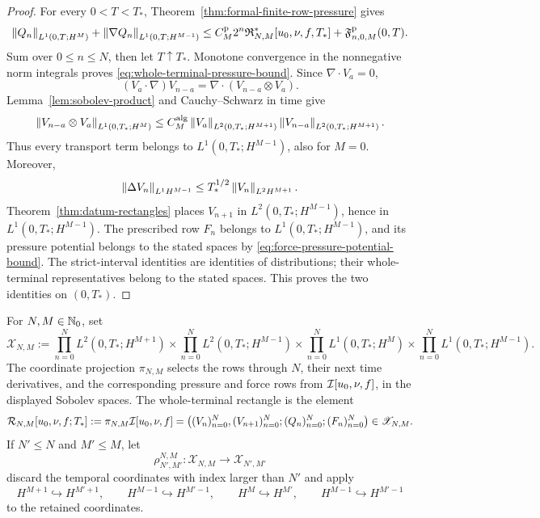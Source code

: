 \begin{proof}
For every \(0<T<T_*\),
Theorem~\ref{thm:formal-finite-row-pressure} gives
\[
 \left\lVert Q_n\right\rVert_{L^1(0,T;H^M)}
 +\left\lVert \nabla Q_n\right\rVert_{L^1(0,T;H^{M-1})}
 \le C_M^{\rm p}2^n\mathfrak R_{N,M}^*[u_0,\nu,f,T_*]
 +\mathfrak F^{\rm p}_{n,0,M}(0,T).
\]
Sum over \(0\le n\le N\), then let \(T\uparrow T_*\).  Monotone
convergence in the nonnegative norm integrals proves
\eqref{eq:whole-terminal-pressure-bound}.  Since
\(\nabla\cdot V_a=0\),
\[
 (V_a\cdot\nabla)V_{n-a}
 =\nabla\cdot(V_{n-a}\otimes V_a).
\]
Lemma~\ref{lem:sobolev-product} and Cauchy--Schwarz in time give
\[
 \left\lVert V_{n-a}\otimes V_a\right\rVert_{L^1(0,T_*;H^M)}
 \le C_M^{\rm alg}
 \left\lVert V_a\right\rVert_{L^2(0,T_*;H^{M+1})}
 \left\lVert V_{n-a}\right\rVert_{L^2(0,T_*;H^{M+1})}.
\]
Thus every transport term belongs to
\(L^1(0,T_*;H^{M-1})\), also for \(M=0\).  Moreover,
\[
 \left\lVert \Delta V_n\right\rVert_{L^1H^{M-1}}
 \le T_*^{1/2}\left\lVert V_n\right\rVert_{L^2H^{M+1}}.
\]
Theorem~\ref{thm:datum-rectangles} places \(V_{n+1}\) in
\(L^2(0,T_*;H^{M-1})\), hence in \(L^1(0,T_*;H^{M-1})\).
The prescribed row \(F_n\) belongs to \(L^1(0,T_*;H^{M-1})\), and its
pressure potential belongs to the stated spaces by
\eqref{eq:force-pressure-potential-bound}.
The strict-interval identities are identities of distributions; their
whole-terminal representatives belong to the stated spaces.  This proves the
two identities on \((0,T_*)\).
\end{proof}

\begin{definition}
\label{def:finite-window-space}
For \(N,M\in\mathbb N_0\), set
\[
 \mathscr X_{N,M}:=
 \prod_{n=0}^{N}L^2(0,T_*;H^{M+1})
 \times
 \prod_{n=0}^{N}L^2(0,T_*;H^{M-1})
 \times
 \prod_{n=0}^{N}L^1(0,T_*;H^M)
 \times
 \prod_{n=0}^{N}L^1(0,T_*;H^{M-1}).
\]
The coordinate projection \(\pi_{N,M}\) selects the rows through
\(N\), their next time derivatives, and the corresponding pressure and force
rows from \(\mathcal I[u_0,\nu,f]\), in the displayed Sobolev spaces.
The whole-terminal rectangle is the element
\begin{equation}
 \mathcal R_{N,M}[u_0,\nu,f;T_*]
 :=\pi_{N,M}\mathcal I[u_0,\nu,f]=\left(
 (V_n)_{n=0}^{N},
 (V_{n+1})_{n=0}^{N};
 (Q_n)_{n=0}^{N};
 (F_n)_{n=0}^{N}
 \right)\in\mathscr X_{N,M}.
 \label{eq:whole-terminal-rectangle-element}
\end{equation}
If \(N'\le N\) and \(M'\le M\), let
\[
 \rho_{N',M'}^{N,M}:\mathscr X_{N,M}\longrightarrow\mathscr X_{N',M'}
\]
discard the temporal coordinates with index larger than \(N'\) and apply
\[
 H^{M+1}\hookrightarrow H^{M'+1},
 \qquad H^{M-1}\hookrightarrow H^{M'-1},
 \qquad H^M\hookrightarrow H^{M'},
 \qquad H^{M-1}\hookrightarrow H^{M'-1}
\]
to the retained coordinates.
\end{definition}

